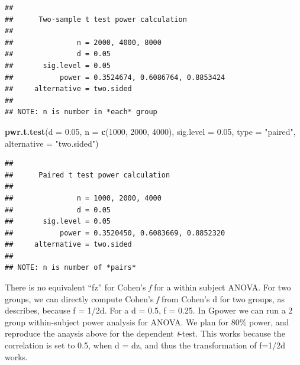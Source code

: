 \documentclass[]{book}
\newenvironment{Shaded}{\begin{snugshade}}{\end{snugshade}}
\newcommand{\DataTypeTok}[1]{\textcolor[rgb]{0.13,0.29,0.53}{#1}}
\newcommand{\DecValTok}[1]{\textcolor[rgb]{0.00,0.00,0.81}{#1}}
\newcommand{\FloatTok}[1]{\textcolor[rgb]{0.00,0.00,0.81}{#1}}
\newcommand{\KeywordTok}[1]{\textcolor[rgb]{0.13,0.29,0.53}{\textbf{#1}}}
\newcommand{\NormalTok}[1]{#1}
\newcommand{\StringTok}[1]{\textcolor[rgb]{0.31,0.60,0.02}{#1}}
\begin{document}
\begin{verbatim}
## 
##      Two-sample t test power calculation 
## 
##               n = 2000, 4000, 8000
##               d = 0.05
##       sig.level = 0.05
##           power = 0.3524674, 0.6086764, 0.8853424
##     alternative = two.sided
## 
## NOTE: n is number in *each* group
\end{verbatim}

\begin{Shaded}
\begin{Highlighting}[]
\KeywordTok{pwr.t.test}\NormalTok{(}\DataTypeTok{d =} \FloatTok{0.05}\NormalTok{,}
           \DataTypeTok{n =} \KeywordTok{c}\NormalTok{(}\DecValTok{1000}\NormalTok{, }\DecValTok{2000}\NormalTok{, }\DecValTok{4000}\NormalTok{),}
           \DataTypeTok{sig.level =} \FloatTok{0.05}\NormalTok{,}
           \DataTypeTok{type =} \StringTok{"paired"}\NormalTok{,}
           \DataTypeTok{alternative =} \StringTok{"two.sided"}\NormalTok{)}
\end{Highlighting}
\end{Shaded}

\begin{verbatim}
## 
##      Paired t test power calculation 
## 
##               n = 1000, 2000, 4000
##               d = 0.05
##       sig.level = 0.05
##           power = 0.3520450, 0.6083669, 0.8852320
##     alternative = two.sided
## 
## NOTE: n is number of *pairs*
\end{verbatim}

There is no equivalent ``fz'' for Cohen's \emph{f} for a within subject ANOVA. For two groups, we can directly compute Cohen's \emph{f} from Cohen's d for two groups, as \citet{cohen1988spa} describes, because f = 1/2d. For a d = 0.5, f = 0.25. In Gpower we can run a 2 group within-subject power analysis for ANOVA. We plan for 80\% power, and reproduce the anaysis above for the dependent \emph{t}-test. This works because the correlation is set to 0.5, when d = dz, and thus the transformation of f=1/2d works.
\end{document}
